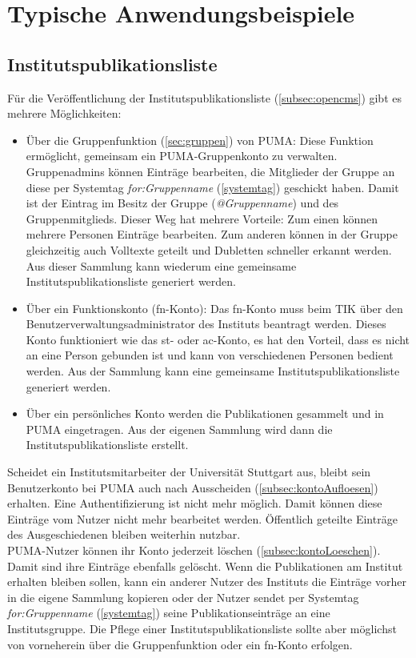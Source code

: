 \chapter{Typische Anwendungsbeispiele}
\label{ch:typischeAnwendungsbeispiele}

\section{Institutspublikationsliste}
\label{sec:institutspublikationsliste}
Für die Veröffentlichung der Institutspublikationsliste (\autoref{subsec:opencms}) gibt es mehrere Möglichkeiten:
\begin{itemize}
\item Über die Gruppenfunktion (\autoref{sec:gruppen}) von PUMA: Diese Funktion ermöglicht, gemeinsam ein PUMA-Gruppenkonto zu verwalten. Gruppenadmins können Einträge bearbeiten, die Mitglieder der Gruppe an diese per Systemtag \textit{for:Gruppenname} (\autoref{systemtag}) geschickt haben. Damit ist der Eintrag im Besitz der Gruppe (\textit{@Gruppenname}) und des Gruppenmitglieds. Dieser Weg hat mehrere Vorteile: Zum einen können mehrere Personen Einträge bearbeiten. Zum anderen können in der Gruppe gleichzeitig auch Volltexte geteilt und Dubletten schneller erkannt werden. Aus dieser  Sammlung kann wiederum eine gemeinsame Institutspublikationsliste generiert werden.
\item Über ein Funktionskonto (fn-Konto): Das fn-Konto muss beim TIK über den Benutzerverwaltungsadministrator des Instituts beantragt werden. Dieses Konto funktioniert wie das st- oder ac-Konto, es hat den Vorteil, dass es nicht an eine Person gebunden ist und kann von verschiedenen Personen bedient werden. Aus der Sammlung kann eine gemeinsame Institutspublikationsliste generiert werden.
\item Über ein persönliches Konto werden die Publikationen gesammelt und in PUMA eingetragen. Aus der eigenen Sammlung wird dann die Institutspublikationsliste erstellt.
\end{itemize}
Scheidet ein Institutsmitarbeiter der Universität Stuttgart aus, bleibt sein Benutzerkonto bei PUMA auch nach Ausscheiden (\autoref{subsec:kontoAufloesen}) erhalten. Eine Authentifizierung ist nicht mehr möglich. Damit können diese Einträge vom Nutzer nicht mehr bearbeitet werden. Öffentlich geteilte Einträge des Ausgeschiedenen bleiben weiterhin nutzbar.\\
PUMA-Nutzer können ihr Konto jederzeit löschen (\autoref{subsec:kontoLoeschen}). Damit sind ihre Einträge ebenfalls gelöscht. Wenn die Publikationen am Institut erhalten bleiben sollen, kann ein anderer Nutzer des Instituts die Einträge vorher in die eigene Sammlung kopieren oder der Nutzer sendet per Systemtag \textit{for:Gruppenname} (\autoref{systemtag}) seine Publikationseinträge an eine Institutsgruppe. Die Pflege einer Institutspublikationsliste sollte aber möglichst von vorneherein über die Gruppenfunktion oder ein fn-Konto erfolgen.

